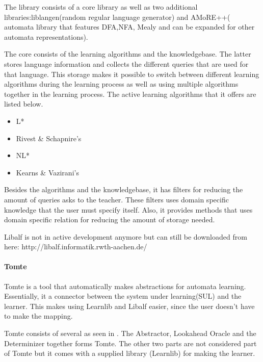 \documentclass[multi,crop=false,class=article]{standalone}
\begin{document}
The library consists of a core library as well as two additional libraries:liblangen(random regular language generator) and AMoRE++(
automata library that features DFA,NFA, Mealy and can be expanded for other automata representations).

The core consists of the learning algorithms and the knowledgebase. The latter stores language information and collects the different
queries that are used for that language. This storage makes it possible to switch between different learning algorithms during the 
learning process as well as using multiple algorithms together in the learning process.
The active learning algorithms that it offers are listed below.

\begin{itemize}
	\item L*
	\item Rivest \& Schapnire's
	\item NL*
	\item Kearns \& Vazirani's
\end{itemize}

Besides the algorithms and the knowledgebase, it has filters for reducing the amount of queries asks to the teacher. These filters 
uses domain specific knowledge %
that the user must specify itself. %
Also, it provides methods that uses domain specific relation for reducing the amount of storage needed.

Libalf is not in active development anymore but can still be downloaded from here: http://libalf.informatik.rwth-aachen.de/



\paragraph{Tomte}

Tomte is a tool that automatically makes abstractions for automata learning. Essentially, it a connector between the system
under learning(SUL) and the learner. This makes using Learnlib and Libalf easier, since the user doesn't have to make the mapping.


Tomte consists of several as seen in %
. The Abstractor, Lookahead Oracle and the Determinizer together forms Tomte. The other two parts are not considered part
of Tomte but it comes with a supplied library (Learnlib) for making the learner.
 
\end{document}
